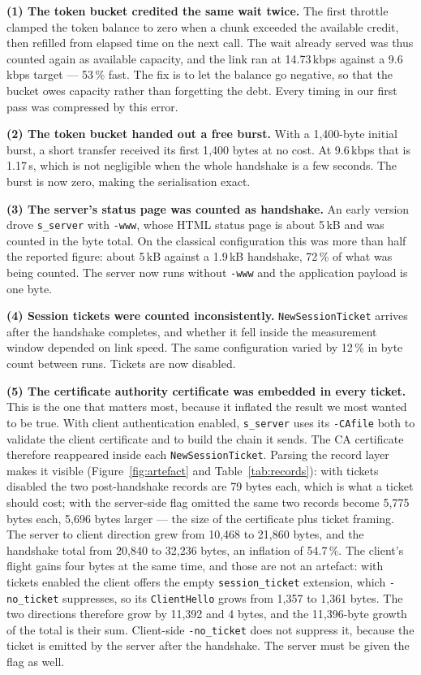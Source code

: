 \documentclass[drones,article,submit,pdftex,moreauthors]{Definitions/mdpi}
\newcommand{\kbps}{kbps}
\begin{document}
\textbf{(1) The token bucket credited the same wait twice.} The first
throttle clamped the token balance to zero when a chunk exceeded the
available credit, then refilled from elapsed time on the next call. The
wait already served was thus counted again as available capacity, and
the link ran at 14.73\,\kbps{} against a 9.6\,\kbps{} target --- 53\,\%
fast. The fix is to let the balance go negative, so that the bucket owes
capacity rather than forgetting the debt. Every timing in our first pass
was compressed by this error.

\textbf{(2) The token bucket handed out a free burst.} With a
1{,}400-byte initial burst, a short transfer received its first
1{,}400 bytes at no cost. At 9.6\,\kbps{} that is 1.17\,s, which is not
negligible when the whole handshake is a few seconds. The burst is now
zero, making the serialisation exact.

\textbf{(3) The server's status page was counted as handshake.} An early
version drove \texttt{s\_server} with \texttt{-www}, whose HTML status
page is about 5\,kB and was counted in the byte total. On the classical
configuration this was more than half the reported figure: about
5\,kB against a 1.9\,kB handshake, 72\,\% of what was being counted.
The server now runs without \texttt{-www} and the application payload is
one byte.

\textbf{(4) Session tickets were counted inconsistently.}
\texttt{NewSessionTicket} arrives after the handshake completes, and
whether it fell inside the measurement window depended on link speed.
The same configuration varied by 12\,\% in byte count between runs.
Tickets are now disabled.

\textbf{(5) The certificate authority certificate was embedded in every
ticket.} This is the one that matters most, because it inflated the
result we most wanted to be true. With client authentication enabled,
\texttt{s\_server} uses its \texttt{-CAfile} both to validate the client
certificate and to build the chain it sends. The CA certificate
therefore reappeared inside each \texttt{NewSessionTicket}. Parsing the
record layer makes it visible (Figure~\ref{fig:artefact} and
Table~\ref{tab:records}): with tickets disabled the two post-handshake
records are 79 bytes each, which is what a ticket should cost; with the
server-side flag omitted the same two records become 5{,}775 bytes each,
5{,}696 bytes larger --- the size of the certificate plus ticket
framing. The server to client direction
grew from 10{,}468 to 21{,}860 bytes, and the handshake total from
20{,}840 to 32{,}236 bytes, an inflation of 54.7\,\%.
The client's flight gains four bytes at the same time, and those are
not an artefact: with tickets enabled the client offers the empty
\texttt{session\_ticket} extension, which \texttt{-no\_ticket}
suppresses, so its \texttt{ClientHello} grows from 1{,}357 to 1{,}361
bytes. The two directions therefore grow by 11{,}392 and 4 bytes, and
the 11{,}396-byte growth of the total is their sum.
Client-side \texttt{-no\_ticket} does not suppress it, because the
ticket is emitted by the server after the handshake. The server must be
given the flag as well.
\end{document}
